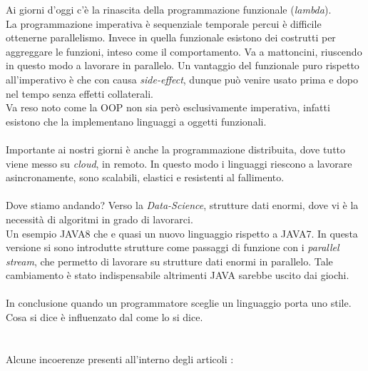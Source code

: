 \documentclass[10pt,a4paper]{book}
\begin{document}
Ai giorni d'oggi c'\`e la rinascita della programmazione funzionale (\textit{lambda}).\\
La programmazione imperativa \`e sequenziale temporale percui \`e difficile ottenerne parallelismo. Invece in quella funzionale esistono dei costrutti per aggreggare le funzioni, inteso come il comportamento. Va a mattoncini, riuscendo in questo modo a lavorare in parallelo. Un vantaggio del funzionale puro rispetto all'imperativo \`e che con causa \textit{side-effect}, dunque pu\`o venire usato prima e dopo nel tempo senza effetti collaterali.\\
Va reso noto come la OOP non sia per\`o esclusivamente imperativa, infatti esistono che la implementano linguaggi a oggetti funzionali.\\\\
Importante ai nostri giorni \`e anche la programmazione distribuita, dove tutto viene messo su \textit{cloud}, in remoto. In questo modo i linguaggi riescono a lavorare asincronamente, sono scalabili, elastici e resistenti al fallimento.\\\\
Dove stiamo andando? Verso la \textit{Data-Science}, strutture dati enormi, dove vi \`e la necessit\`a di algoritmi in grado di lavorarci.\\
Un esempio JAVA8 che e quasi un nuovo linguaggio rispetto a JAVA7.  In questa versione si sono introdutte strutture come passaggi di funzione con i \textit{parallel stream}, che permetto di lavorare su strutture dati enormi in parallelo. Tale cambiamento \`e stato indispensabile altrimenti JAVA sarebbe uscito dai giochi.\\\\
In conclusione quando un programmatore sceglie un linguaggio porta uno stile. Cosa si dice \`e influenzato dal come lo si dice.
\\\\\\
Alcune incoerenze presenti all'interno degli articoli :
\end{document}
